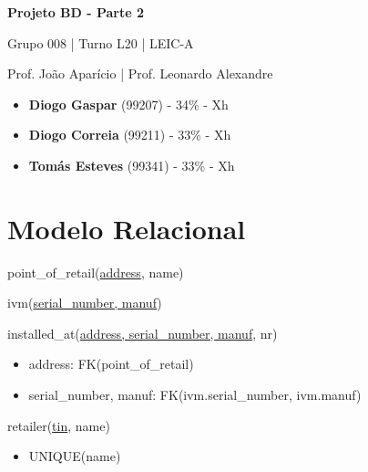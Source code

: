 \documentclass[12pt,a4paper]{article}
\begin{document}
  \begin{titlepage}
    \begin{center}
      \vspace*{5cm}
    
      \Huge
      \textbf{Projeto BD - Parte 2}

      \vspace{0.5cm}
      \LARGE
      Grupo 008 | Turno L20 | LEIC-A

      \vspace{0.5cm}
      \large
      Prof. João Aparício | Prof. Leonardo Alexandre

      \vfill
    \end{center}
    \large
    \begin{itemize}
      \item[] \textbf{Diogo Gaspar} (99207) - 34\% - Xh
      \item[] \textbf{Diogo Correia} (99211) - 33\% - Xh
      \item[] \textbf{Tomás Esteves} (99341) - 33\% - Xh
    \end{itemize}
  \end{titlepage}

  \section*{Modelo Relacional}

  \ttfamily

  \noindent
  point\_of\_retail(\underline{address}, name)
  
  \vspace*{10pt}

  \noindent
  ivm(\underline{serial\_number, manuf})

  \vspace*{10pt}

  \noindent
  installed\_at(\underline{address, serial\_number, manuf}, nr)
  \begin{itemize}[nosep]
    \item address: FK(point\_of\_retail)
    \item serial\_number, manuf: FK(ivm.serial\_number, ivm.manuf)
  \end{itemize}
  
  \vspace*{10pt}
  
  \noindent
  retailer(\underline{tin}, name)
  \begin{itemize}[nosep]
    \item UNIQUE(name)
  \end{itemize}
  
\end{document}
